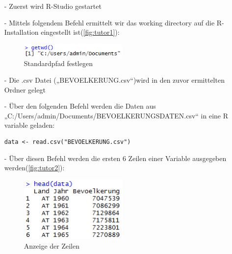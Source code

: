 \begin{itemize}
\item[-]Zuerst wird R-Studio gestartet

\item[-]Mittels folgendem Befehl ermittelt wir das working directory auf die R-Installation eingestellt ist(\autoref{fig:tutor1}):
\begin{figure}[!htb]
        \begin{minipage}{1\textwidth}
                \centering
                \includegraphics[width=0.50\textwidth]{pics/tutor1.png}\par\vspace{0cm}
                \caption{Standardpfad festlegen}
                \label{fig:tutor1}
        \end{minipage}
\end{figure}
	
\item[-]Die .csv Datei („BEVOELKERUNG.csv“)wird in den zuvor ermittelten Ordner gelegt

\item[-]Über den folgenden Befehl werden die Daten aus \\ „C:/Users/admin/Documents/BEVOELKERUNGSDATEN.csv“ in eine R variable geladen:
\begin{lstlisting}
data <- read.csv("BEVOELKERUNG.csv")
\end{lstlisting}
\item[-]Über diesen Befehl werden die ersten 6 Zeilen einer Variable ausgegeben werden(\autoref{fig:tutor2}):
\begin{figure}[!htb]
        \begin{minipage}{1\textwidth}
                \centering
                \includegraphics[width=0.50\textwidth]{pics/tutor2.png}\par\vspace{0cm}
                \caption{Anzeige der Zeilen}
                \label{fig:tutor2}
        \end{minipage}
\end{figure}


\end{itemize}
